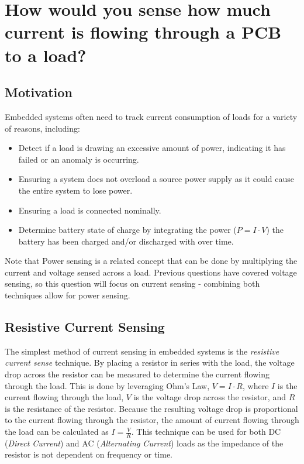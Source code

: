 \documentclass[main.tex]{subfiles}
\begin{document}
\section{How would you sense how much current is flowing through a PCB to a load?}


\spoilerline

\subsection{Motivation}
Embedded systems often need to track current consumption of loads for a variety of reasons, including:
\begin{itemize}
    \item Detect if a load is drawing an excessive amount of power, indicating it has failed or an anomaly is occurring. 
    \item Ensuring a system does not overload a source power supply as it could cause the entire system to lose power. 
    \item Ensuring a load is connected nominally.
    \item Determine battery state of charge by integrating the power ($P = I \cdot V$) the battery has been charged and/or discharged with over time.
\end{itemize}

\noindent Note that Power sensing is a related concept that can be done by multiplying the current and voltage sensed across a load. Previous questions have covered voltage sensing, so this question will focus on current sensing - combining both techniques allow for power sensing.

\subsection{Resistive Current Sensing}
The simplest method of current sensing in embedded systems is the \textit{resistive current sense} technique. By placing a resistor in series with the load, the voltage drop across the resistor can be measured to determine the current flowing through the load. This is done by leveraging Ohm's Law, $V = I \cdot R$, where $I$ is the current flowing through the load, $V$ is the voltage drop across the resistor, and $R$ is the resistance of the resistor. Because the resulting voltage drop is proportional to the current flowing through the resistor, the amount of current flowing through the load can be calculated as $I = \frac{V}{R}$. This technique can be used for both DC (\textit{Direct Current}) and AC (\textit{Alternating Current}) loads as the impedance of the resistor is not dependent on frequency or time.
\end{document}
